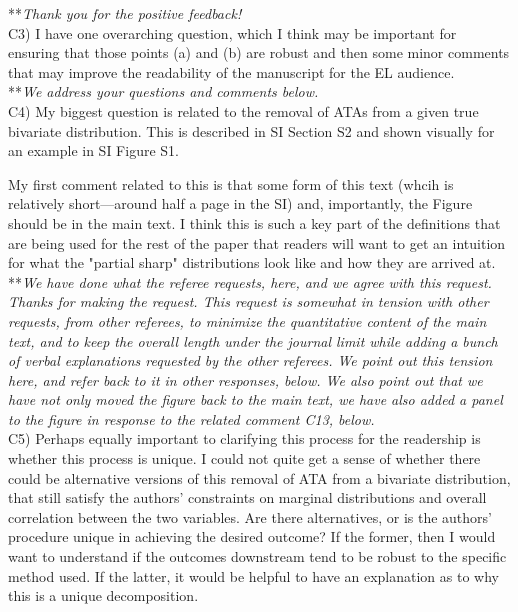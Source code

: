\documentclass[letterpaper,11pt]{article}
\begin{document}
\noindent ***\emph{Thank you for the positive feedback!} \\

\noindent C3) I have one overarching question, which I think may be important for ensuring that those points (a) and (b) are robust and then some minor comments that may improve the readability of the manuscript for the EL audience. \\

\noindent ***\emph{We address your questions and comments below.} \\

\noindent C4) My biggest question is related to the removal of ATAs from a given true bivariate distribution.  This is described in SI Section S2 and shown visually for an example in SI Figure S1. 

My first comment related to this is that some form of this text (whcih is relatively short---around half a page in the SI) and, importantly, the Figure should be in the main text.  I think this is such a key part of the definitions that are being used for the rest of the paper that readers will want to get an intuition for what the "partial sharp" distributions look like and how they are arrived at. \\

\noindent ***\emph{We have done what the referee requests, here, and we agree with this request. Thanks for
making the request. This request is somewhat in tension with other requests, from other referees, 
to minimize the quantitative 
content of the main text, and to keep the overall length under the journal limit while adding a bunch of
verbal explanations requested by the other referees. We point out this tension here, and refer back to it in
other responses, below. We also point out that we have not only moved the figure back to the main text,
we have also added a panel to the figure in response to the related comment C13, below.} \\

\noindent C5) Perhaps equally important to clarifying this process for the readership is whether this process is unique. I could not quite get a sense of whether there could be alternative versions of this removal of ATA from a bivariate distribution, that still satisfy the authors' constraints on marginal distributions and overall correlation between the two variables. Are there alternatives, or is the authors' procedure unique in achieving the desired outcome?  If the former, then I would want to understand if the outcomes downstream tend to be robust to the specific method used. If the latter, it would be helpful to have an explanation as to why this is a unique decomposition. \\
\end{document}

